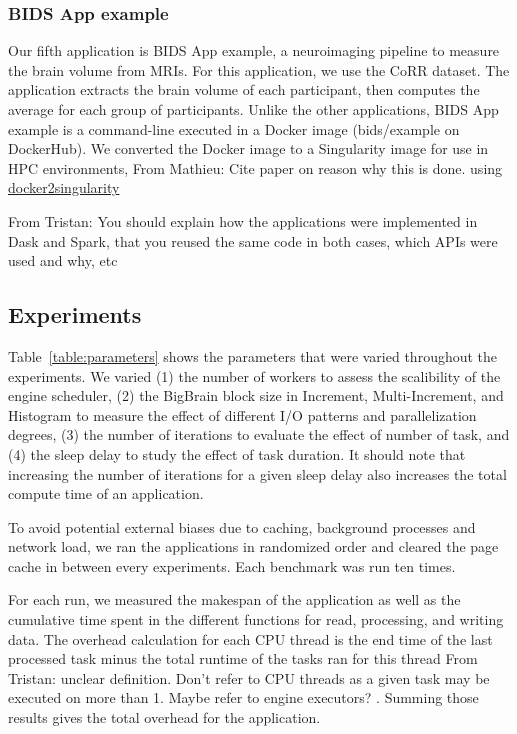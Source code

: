 \documentclass[conference]{IEEEtran}
\newcommand{\TG}[1]{\color{cyan}From Tristan: #1 \color{black}}
\newcommand{\MD}[1]{\color{magenta}From Mathieu: #1 \color{black}}
\begin{document}
	
\subsubsection{BIDS App example}
Our fifth application is BIDS App example, a neuroimaging pipeline to
measure the brain volume from MRIs. For this application, we use the CoRR
dataset. The application extracts the brain volume of each participant,
then computes the average for each group of participants. Unlike the other
applications, BIDS App example is a command-line executed in a Docker image
(bids/example on DockerHub). We converted the Docker image to a Singularity
image for use in HPC environments, \MD{Cite paper on reason why this is
done.} using
\href{https://hub.docker.com/r/singularityware/docker2singularity/tags/}{docker2singularity}

\TG{You should explain how the applications were implemented in Dask and
Spark, that you reused the same code in both  cases, which APIs were used 
and why, etc}

\subsection{Experiments}
Table~\ref{table:parameters} shows the parameters that were varied
throughout the experiments. We varied (1) the number of workers to assess
the scalibility of the engine scheduler, (2) the BigBrain
block size in Increment, Multi-Increment, and Histogram to measure the
effect of different I/O patterns and parallelization degrees, (3) the
number of iterations to evaluate the effect of number of task, and (4) the
sleep delay to study the effect of task duration. It should note that
increasing the number of iterations for a given sleep delay also increases
the total compute time of an application.

To avoid potential external biases due to caching, background processes and
network load, we ran the applications in randomized order and cleared the
page cache in between every experiments. Each benchmark was run ten times.

For each run, we measured the makespan of the application as well as the
cumulative time spent in the different functions for read, processing, and
writing data. The overhead calculation for each CPU thread is the end time
of the last processed task minus the total runtime of the tasks ran for
this thread \TG{unclear definition. Don't refer to CPU threads as a given task may be executed on more than 1. Maybe refer to engine executors?}. Summing those results gives the total overhead for the
application.
\end{document}
